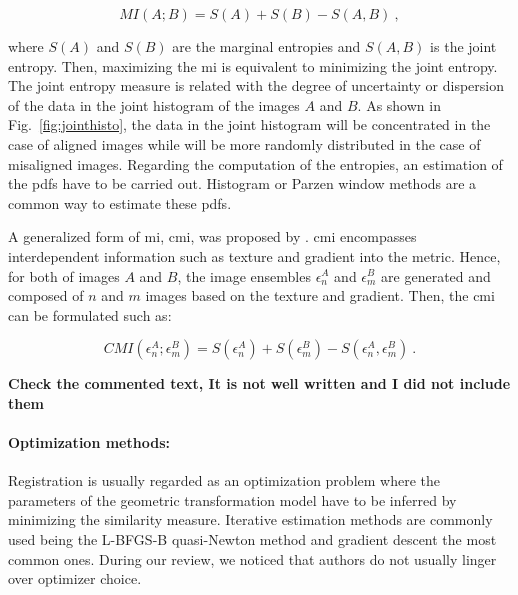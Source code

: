 \begin{equation}
	MI(A;B) = S(A) + S(B) - S(A,B) \ ,
	\label{eq:midef}
\end{equation}

\noindent where $S(A)$ and $S(B)$ are the marginal entropies and $S(A,B)$ is the joint entropy.
Then, maximizing the \ac{mi} is equivalent to minimizing the joint entropy. 
The joint entropy measure is related with the degree of uncertainty or dispersion of the data in the joint histogram of the images $A$ and $B$.
As shown in Fig.~\ref{fig:jointhisto}, the data in the joint histogram will be concentrated in the case of aligned images while will be more randomly distributed in the case of misaligned images.
Regarding the computation of the entropies, an estimation of the \acp{pdf} have to be carried out.
Histogram or Parzen window methods are a common way to estimate these \acp{pdf}.

A generalized form of \ac{mi}, \ac{cmi}, was proposed by \cite{Chappelow2011}.
\ac{cmi} encompasses interdependent information such as texture and gradient into the metric.
Hence, for both of images $A$ and $B$, the image ensembles $\epsilon^{A}_n$ and $\epsilon^{B}_m$ are generated and composed of $n$ and $m$ images based on the texture and gradient.
Then, the \ac{cmi} can be formulated such as:

\begin{equation}
	CMI(\epsilon^{A}_n;\epsilon^{B}_m) = S(\epsilon^{A}_n) + S(\epsilon^{B}_m) - S(\epsilon^{A}_n,\epsilon^{B}_m) \ .
	\label{eq:cmidef}
\end{equation}

{\color{red} \textbf{Check the commented text, It is not well written and I did not include them}}

\paragraph{Optimization methods:}
Registration is usually regarded as an optimization problem where the parameters of the geometric transformation model have to be inferred by minimizing the similarity measure.
Iterative estimation methods are commonly used being the L-BFGS-B quasi-Newton method \cite{Byrd1995} and gradient descent \cite{Viola1997} the most common ones. %
During our review, we noticed that authors do not usually linger over optimizer choice.

